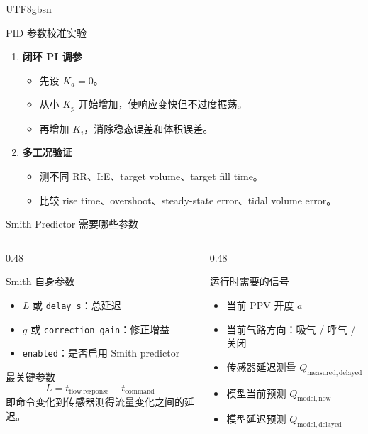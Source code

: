 \documentclass[aspectratio=169,10pt]{beamer}
\newcommand{\code}[1]{\texttt{\small #1}}
\begin{document}
\begin{CJK*}{UTF8}{gbsn}
\begin{frame}[shrink=5]{PID 参数校准实验}
\begin{enumerate}
    \item \textbf{闭环 PI 调参}
      \begin{itemize}
        \item 先设 $K_d=0$。
        \item 从小 $K_p$ 开始增加，使响应变快但不过度振荡。
        \item 再增加 $K_i$，消除稳态误差和体积误差。
      \end{itemize}

    \item \textbf{多工况验证}
      \begin{itemize}
        \item 测不同 RR、I:E、target volume、target fill time。
        \item 比较 rise time、overshoot、steady-state error、tidal volume error。
      \end{itemize}
  \end{enumerate}
\end{frame}

\begin{frame}{Smith Predictor 需要哪些参数}
  \begin{columns}[T,onlytextwidth]
    \begin{column}{0.48\textwidth}
      \begin{block}{Smith 自身参数}
        \begin{itemize}
          \item $L$ 或 \code{delay\_s}：总延迟
          \item $g$ 或 \code{correction\_gain}：修正增益
          \item \code{enabled}：是否启用 Smith predictor
        \end{itemize}
      \end{block}

      \begin{block}{最关键参数}
        \[
          L =
          t_{\mathrm{flow\ response}}
          -
          t_{\mathrm{command}}
        \]
        即命令变化到传感器测得流量变化之间的延迟。
      \end{block}
    \end{column}
    \begin{column}{0.48\textwidth}
      \begin{block}{运行时需要的信号}
        \begin{itemize}
          \item 当前 PPV 开度 $a$
          \item 当前气路方向：吸气 / 呼气 / 关闭
          \item 传感器延迟测量 $Q_{\mathrm{measured,delayed}}$
          \item 模型当前预测 $Q_{\mathrm{model,now}}$
          \item 模型延迟预测 $Q_{\mathrm{model,delayed}}$
        \end{itemize}
      \end{block}


\end{column}
\end{columns}
\end{frame}
\end{CJK*}
\end{document}
